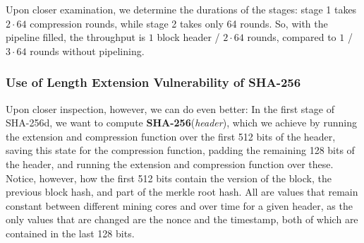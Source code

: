 Upon closer examination, we determine the durations of the stages: stage 1 takes $2 \cdot 64$ compression rounds, while stage 2 takes only 64 rounds. So, with the pipeline filled, the throughput is $1$ block header / $2 \cdot 64$ rounds, compared to $1$ / $3 \cdot 64$ rounds without pipelining.


\subsubsection{Use of Length Extension Vulnerability of SHA-256}
\label{length_extension}

Upon closer inspection, however, we can do even better: In the first stage of SHA-256d, we want to compute \textbf{SHA-256}(\textit{header}), which we achieve by running the extension and compression function over the first 512 bits of the header, saving this state for the compression function, padding the remaining 128 bits of the header, and running the extension and compression function over these. Notice, however, how the first 512 bits contain the version of the block, the previous block hash, and part of the merkle root hash. All are values that remain constant between different mining cores and over time for a given header, as the only values that are changed are the nonce and the timestamp, both of which are contained in the last 128 bits.

